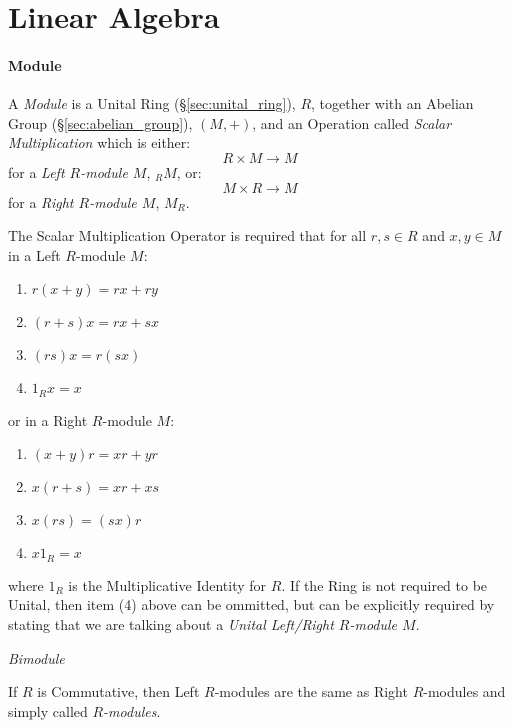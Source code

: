 \part{Linear Algebra}\label{sec:linear_algebra}

\subsection{Module}\label{sec:module}

A \emph{Module} is a Unital Ring (\S\ref{sec:unital_ring}), $R$,
together with an Abelian Group (\S\ref{sec:abelian_group}), $(M, +)$,
and an Operation called \emph{Scalar Multiplication} which is either:
\[ R \times M \rightarrow M \]
for a \emph{Left $R$-module $M$}, $_R M$, or:
\[ M \times R \rightarrow M \]
for a \emph{Right $R$-module $M$}, $M_R$.

The Scalar Multiplication Operator is required that for all $r,s \in
R$ and $x,y \in M$ in a Left $R$-module $M$:
\begin{enumerate}
    \item $r(x + y) = rx + ry$
    \item $(r + s)x = rx + sx$
    \item $(rs)x = r(sx)$
    \item $1_Rx = x$
\end{enumerate}
or in a Right $R$-module $M$:
\begin{enumerate}
    \item $(x + y)r = xr + yr$
    \item $x(r + s) = xr + xs$
    \item $x(rs) = (sx)r$
    \item $x 1_R = x$
\end{enumerate}
where $1_R$ is the Multiplicative Identity for $R$. If the Ring is not
required to be Unital, then item (4) above can be ommitted, but can be
explicitly required by stating that we are talking about a
\emph{Unital Left/Right $R$-module $M$}.

\emph{Bimodule}

If $R$ is Commutative, then Left $R$-modules are the same as Right
$R$-modules and simply called \emph{$R$-modules}.

